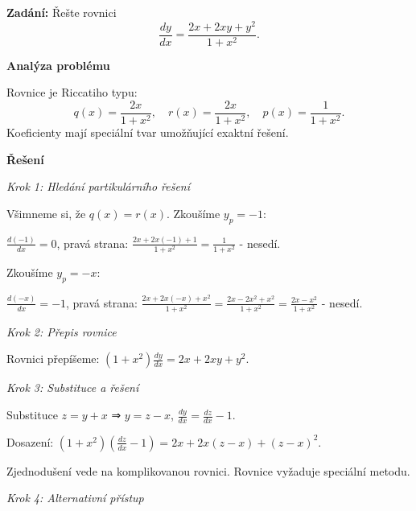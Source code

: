         \vspace{2\baselineskip}
        
        \begin{example}
        \label{ex:a3-stredni-exaktni}
        
        \noindent\textbf{Zadání:} Řešte rovnici
        \[
        \frac{dy}{dx} = \frac{2x + 2xy + y^2}{1 + x^2}.
        \]
        
        \vspace{1.5\baselineskip}
        
        \noindent\textbf{Analýza problému}
        
        \noindent Rovnice je Riccatiho typu:
        \[
        q(x) = \frac{2x}{1 + x^2}, \quad r(x) = \frac{2x}{1 + x^2}, \quad p(x) = \frac{1}{1 + x^2}.
        \]
        Koeficienty mají speciální tvar umožňující exaktní řešení.
        
        \vspace{1.5\baselineskip}
        
        \noindent\textbf{Řešení}
        
        \noindent\textit{Krok 1: Hledání partikulárního řešení}
        
        Všimneme si, že $q(x) = r(x)$. Zkoušíme $y_p = -1$:
        
        $\frac{d(-1)}{dx} = 0$, pravá strana: $\frac{2x + 2x(-1) + 1}{1 + x^2} = \frac{1}{1 + x^2}$ - nesedí.
        
        Zkoušíme $y_p = -x$:
        
        $\frac{d(-x)}{dx} = -1$, pravá strana: $\frac{2x + 2x(-x) + x^2}{1 + x^2} = \frac{2x - 2x^2 + x^2}{1 + x^2} = \frac{2x - x^2}{1 + x^2}$ - nesedí.
        
        \noindent\textit{Krok 2: Přepis rovnice}
        
        Rovnici přepíšeme: $(1 + x^2)\frac{dy}{dx} = 2x + 2xy + y^2$.
        
        \noindent\textit{Krok 3: Substituce a řešení}
        
        Substituce $z = y + x$ ⇒ $y = z - x$, $\frac{dy}{dx} = \frac{dz}{dx} - 1$.
        
        Dosazení: $(1 + x^2)\left(\frac{dz}{dx} - 1\right) = 2x + 2x(z - x) + (z - x)^2$.
        
        Zjednodušení vede na komplikovanou rovnici. Rovnice vyžaduje speciální metodu.
        
        \noindent\textit{Krok 4: Alternativní přístup}
        

\end{example}

